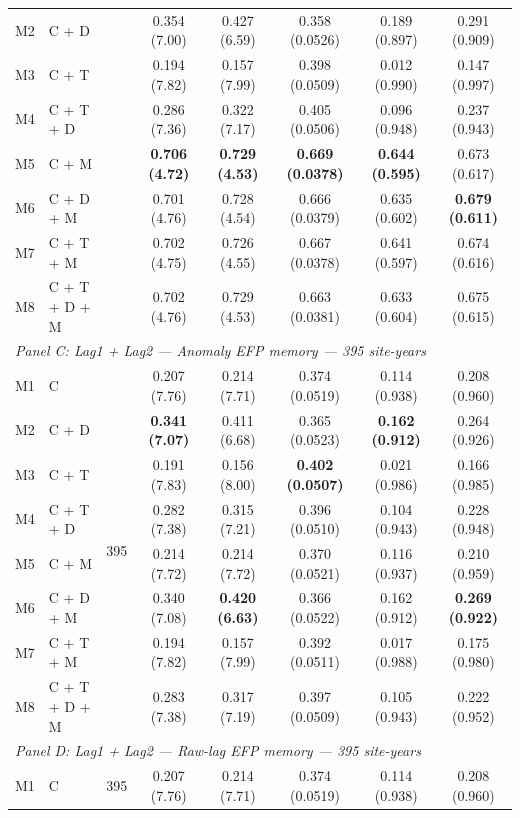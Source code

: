 \begin{table}[htbp]
\begin{tabular}{llcccccc}
M2 & C + D &  & 0.354 (7.00) & 0.427 (6.59) & 0.358 (0.0526) & 0.189 (0.897) & 0.291 (0.909) \\
M3 & C + T &  & 0.194 (7.82) & 0.157 (7.99) & 0.398 (0.0509) & 0.012 (0.990) & 0.147 (0.997) \\
M4 & C + T + D &  & 0.286 (7.36) & 0.322 (7.17) & 0.405 (0.0506) & 0.096 (0.948) & 0.237 (0.943) \\
M5 & C + M &  & \textbf{0.706 (4.72)} & \textbf{0.729 (4.53)} & \textbf{0.669 (0.0378)} & \textbf{0.644 (0.595)} & 0.673 (0.617) \\
M6 & C + D + M &  & 0.701 (4.76) & 0.728 (4.54) & 0.666 (0.0379) & 0.635 (0.602) & \textbf{0.679 (0.611)} \\
M7 & C + T + M &  & 0.702 (4.75) & 0.726 (4.55) & 0.667 (0.0378) & 0.641 (0.597) & 0.674 (0.616) \\
M8 & C + T + D + M &  & 0.702 (4.76) & 0.729 (4.53) & 0.663 (0.0381) & 0.633 (0.604) & 0.675 (0.615) \\
\midrule
\multicolumn{8}{l}{\textit{Panel C: Lag1 + Lag2 --- Anomaly EFP memory --- 395 site-years}} \\
\midrule
M1 & C & \multirow{8}{*}{395} & 0.207 (7.76) & 0.214 (7.71) & 0.374 (0.0519) & 0.114 (0.938) & 0.208 (0.960) \\
M2 & C + D &  & \textbf{0.341 (7.07)} & 0.411 (6.68) & 0.365 (0.0523) & \textbf{0.162 (0.912)} & 0.264 (0.926) \\
M3 & C + T &  & 0.191 (7.83) & 0.156 (8.00) & \textbf{0.402 (0.0507)} & 0.021 (0.986) & 0.166 (0.985) \\
M4 & C + T + D &  & 0.282 (7.38) & 0.315 (7.21) & 0.396 (0.0510) & 0.104 (0.943) & 0.228 (0.948) \\
M5 & C + M &  & 0.214 (7.72) & 0.214 (7.72) & 0.370 (0.0521) & 0.116 (0.937) & 0.210 (0.959) \\
M6 & C + D + M &  & 0.340 (7.08) & \textbf{0.420 (6.63)} & 0.366 (0.0522) & 0.162 (0.912) & \textbf{0.269 (0.922)} \\
M7 & C + T + M &  & 0.194 (7.82) & 0.157 (7.99) & 0.392 (0.0511) & 0.017 (0.988) & 0.175 (0.980) \\
M8 & C + T + D + M &  & 0.283 (7.38) & 0.317 (7.19) & 0.397 (0.0509) & 0.105 (0.943) & 0.222 (0.952) \\
\midrule
\multicolumn{8}{l}{\textit{Panel D: Lag1 + Lag2 --- Raw-lag EFP memory --- 395 site-years}} \\
\midrule
M1 & C & \multirow{8}{*}{395} & 0.207 (7.76) & 0.214 (7.71) & 0.374 (0.0519) & 0.114 (0.938) & 0.208 (0.960) \\

\end{tabular}
\end{table}
